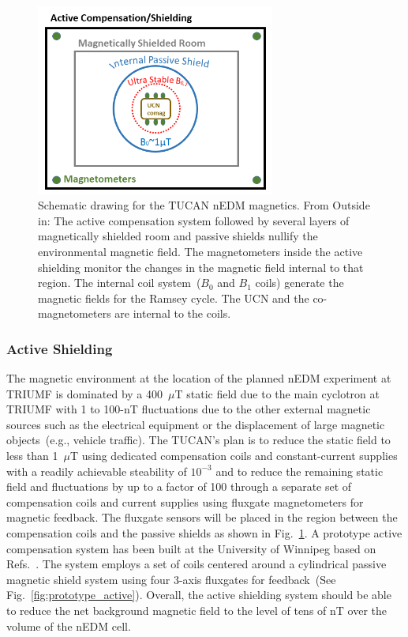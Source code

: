 \begin{figure}[h!]
  \centering
  \includegraphics[width=0.7\textwidth]{magneticscheme.png}
  \caption{Schematic drawing for the TUCAN nEDM magnetics. From
    Outside in: The active compensation system followed by several
    layers of magnetically shielded room and passive shields nullify
    the environmental magnetic field. The magnetometers inside the
    active shielding monitor the changes in the magnetic field
    internal to that region. The internal coil system~($B_0$ and $B_1$
    coils) generate the magnetic fields for the Ramsey cycle. The UCN
    and the co-magnetometers are internal to the coils.  }
  \label{fig:magneticscheme}
\end{figure}



\subsubsection{Active Shielding}

The magnetic environment at the location of the planned nEDM
experiment at TRIUMF is dominated by a 400~$\mu$T static field due to
the main cyclotron at TRIUMF with 1 to 100-nT fluctuations due to the
other external magnetic sources such as the electrical equipment or
the displacement of large magnetic objects~(e.g., vehicle traffic).
The TUCAN's plan is to reduce the static field to less than 1~$\mu$T
using dedicated compensation coils and constant-current supplies with
a readily achievable steability of $10^{-3}$ and to reduce the
remaining static field and fluctuations by up to a factor of 100
through a separate set of compensation coils and current supplies
using fluxgate magnetometers for magnetic feedback. The fluxgate
sensors will be placed in the region between the compensation coils
and the passive shields as shown in Fig.~\ref{fig:magneticscheme}.  A
prototype active compensation system has been built at the University
of Winnipeg based on Refs.~\cite{beatrice,afach2014dynamic}. The
system employs a set of coils centered around a cylindrical passive
magnetic shield system using four 3-axis fluxgates for feedback~(See
Fig.~\ref{fig:prototype_active}). Overall, the active shielding
system should be able to reduce the net background magnetic field to
the level of tens of nT over the volume of the nEDM cell.


